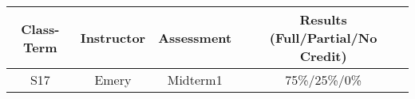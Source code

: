 \begin{outcomes}
	\begin{center}
		\begin{tabular}{cccc}
			\hline\hline
                Class-Term & Instructor & Assessment & Results (Full/Partial/No Credit) \\
			\hline
                S17 & Emery & Midterm1 & 75\%/25\%/0\%\\
			\hline
		\end{tabular}
	\end{center}
\end{outcomes}

\begin{comments}


\end{comments}